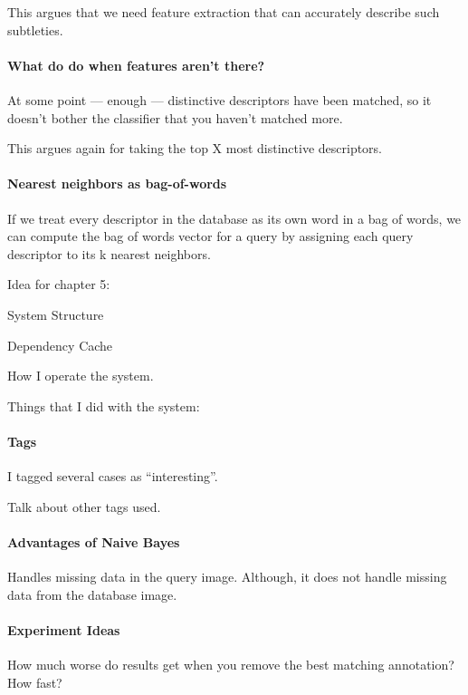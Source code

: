 This argues that we need feature extraction that can accurately describe
such subtleties.


\paragraph{What do do when features aren't there?}

At some point --- enough --- distinctive descriptors have been matched, so it doesn't bother the classifier that 
you haven't matched more.

This argues again for taking the top X most distinctive descriptors.


\paragraph{Nearest neighbors as bag-of-words}

If we treat every descriptor in the database as its own word in a bag of words,
we can compute the bag of words vector for a query by assigning each query
descriptor to its k nearest neighbors.


Idea for chapter 5:

System Structure

Dependency Cache

How I operate the system.

Things that I did with the system:

\paragraph{Tags}

I tagged several cases as ``interesting''. 

Talk about other tags used.


\paragraph{Advantages of Naive Bayes}
Handles missing data in the query image.  Although, it does not handle missing data from the database image.



\paragraph{Experiment Ideas}
How much worse do results get when you remove the best matching annotation?
How fast?

